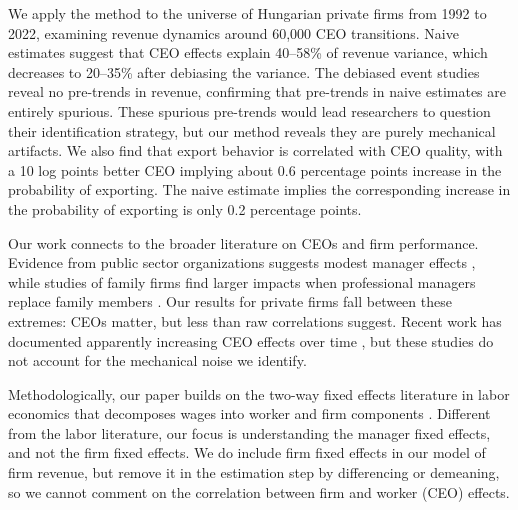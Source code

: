 \documentclass[11pt,a4paper]{article}
\begin{document}
We apply the method to the universe of Hungarian private firms from 1992 to 2022, examining revenue dynamics around 60,000 CEO transitions. Naive estimates suggest that CEO effects explain 40--58\% of revenue variance, which decreases to 20--35\% after debiasing the variance. The debiased event studies reveal no pre-trends in revenue, confirming that pre-trends in naive estimates are entirely spurious. These spurious pre-trends would lead researchers to question their identification strategy, but our method reveals they are purely mechanical artifacts. We also find that export behavior is correlated with CEO quality, with a 10 log points better CEO implying about 0.6 percentage points increase in the probability of exporting. The naive estimate implies the corresponding increase in the probability of exporting is only 0.2 percentage points.


Our work connects to the broader literature on CEOs and firm performance. Evidence from public sector organizations suggests modest manager effects \citep{fenizia2022managers, janke2024role}, while studies of family firms find larger impacts when professional managers replace family members \citep{bennedsen2007inside, sraer2007performance}. Our results for private firms fall between these extremes: CEOs matter, but less than raw correlations suggest. Recent work has documented apparently increasing CEO effects over time \citep{quigley2015has}, but these studies do not account for the mechanical noise we identify. 

Methodologically, our paper builds on the two-way fixed effects literature in labor economics that decomposes wages into worker and firm components \citep{Abowd1999Econometrica, Card2018JoLE}. Different from the labor literature, our focus is understanding the manager fixed effects, and not the firm fixed effects. We do include firm fixed effects in our model of firm revenue, but remove it in the estimation step by differencing or demeaning, so we cannot comment on the correlation between firm and worker (CEO) effects. 

\end{document}

